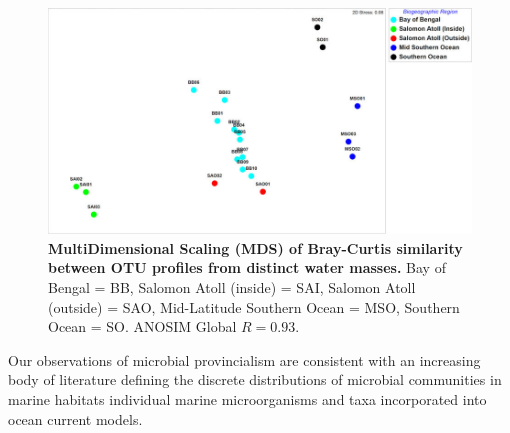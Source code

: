 \begin{figure}
    \centering
    \includegraphics[width=\textwidth]{Chagos/figures/fig2}
    \caption{\textbf{MultiDimensional Scaling (MDS) of Bray-Curtis similarity between OTU profiles from distinct water masses.} Bay of Bengal = BB, Salomon Atoll (inside) = SAI, Salomon Atoll (outside) = SAO, Mid-Latitude Southern Ocean = MSO, Southern Ocean = SO. ANOSIM Global $R = 0.93$.}
    \label{Chagos_fig2}
\end{figure}

Our observations of microbial provincialism are consistent with an increasing body of literature defining the discrete distributions of microbial communities in marine habitats \cite{brown_microbial_2009, agogue_water_2011, jeffries_substrate_2011, galand_unique_2009} individual marine microorganisms \cite{gomez-pereira_distinct_2010, brown_global_2012} and taxa incorporated into ocean current models. \cite{wilkins_advection_2013, hellweger_biogeographic_2014}

